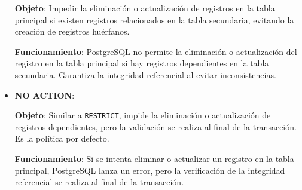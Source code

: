 \begin{itemize}
    \textbf{Objeto}: Impedir la eliminación o actualización de registros en la tabla principal si existen registros relacionados en la tabla secundaria, evitando la creación de registros huérfanos.
    
    \textbf{Funcionamiento}: PostgreSQL no permite la eliminación o actualización del registro en la tabla principal si hay registros dependientes en la tabla secundaria. Garantiza la integridad referencial al evitar inconsistencias.
    
    \vspace{0.5cm}
    
    \item \textbf{NO ACTION}: 
    
    \textbf{Objeto}: Similar a \texttt{RESTRICT}, impide la eliminación o actualización de registros dependientes, pero la validación se realiza al final de la transacción. Es la política por defecto.
    
    \textbf{Funcionamiento}: Si se intenta eliminar o actualizar un registro en la tabla principal, PostgreSQL lanza un error, pero la verificación de la integridad referencial se realiza al final de la transacción.
    
    \vspace{0.5cm}
\end{itemize}
